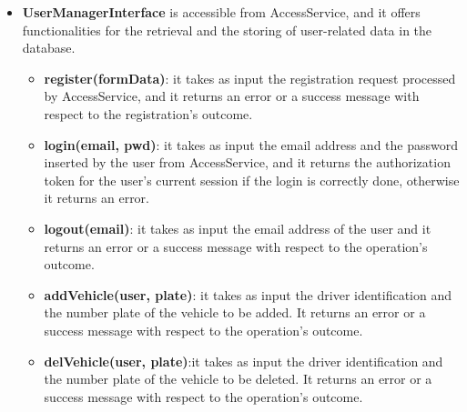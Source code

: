 \documentclass[../main.tex]{subfiles}
\begin{document}
\begin{itemize}
    \item \textbf{UserManagerInterface} is accessible from AccessService, and it offers functionalities for the retrieval and the storing of user-related data in the database.
    \begin{itemize}
        \item \textbf{register(formData)}: it takes as input the registration request processed by AccessService, and it returns an error or a success message with respect to the registration's outcome.
        \item \textbf{login(email, pwd)}: it takes as input the email address and the password inserted by the user from AccessService, and it returns the authorization token for the user's current session if the login is correctly done, otherwise it returns an error.
        \item \textbf{logout(email)}: it takes as input the email address of the user and it returns an error or a success message with respect to the operation's outcome.
        \item \textbf{addVehicle(user, plate)}: it takes as input the driver identification and the number plate of the vehicle to be added. It returns an error or a success message with respect to the operation's outcome.
        \item \textbf{delVehicle(user, plate)}:it takes as input the driver identification and the number plate of the vehicle to be deleted. It returns an error or a success message with respect to the operation's outcome.
    \end{itemize}


\end{itemize}
\end{document}
